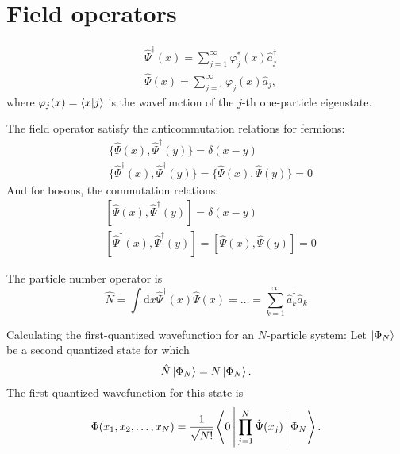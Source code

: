 \documentclass[11pt, a4paper]{article}
\newcommand{\dd}{\mathrm{d}}
\begin{document}
\section{Field operators}
\begin{align*}
    &\hat\Psi^{\dagger}(x) = \sum\limits_{j=1}^{\infty}\varphi^*_j(x)\hat a_j^{\dagger}\\
    &\hat\Psi(x) = \sum\limits_{j=1}^{\infty}\varphi_j(x)\hat a_j,
\end{align*}
where $\varphi_j(x) = \braket{x|j}$ is the wavefunction of the $j$-th one-particle eigenstate.

The field operator satisfy the anticommutation relations for fermions:
\begin{align*}
    &\{\hat\Psi(x),\hat\Psi^{\dagger}(y)\} = \delta(x-y)\\
    &\{\hat\Psi^{\dagger}(x),\hat\Psi^{\dagger}(y)\} = \{\hat\Psi(x),\hat\Psi(y)\} = 0
\end{align*}
And for bosons, the commutation relations:
\begin{align*}
    &[\hat\Psi(x),\hat\Psi^{\dagger}(y)] = \delta(x-y)\\
    &[\hat\Psi^{\dagger}(x),\hat\Psi^{\dagger}(y)] = [\hat\Psi(x),\hat\Psi(y)] = 0
\end{align*}

The particle number operator is 
\begin{equation*}
    \hat N = \int\dd x \hat\Psi^{\dagger}(x)\hat\Psi(x) = \dots = \sum\limits_{k=1}^{\infty}\hat a_k^{\dagger}\hat a_k
\end{equation*}

Calculating the first-quantized wavefunction for an $N$-particle system:
Let $\ket{\Phi_N}$ be a second quantized state for which
\begin{equation*}
    \hat N \ket{\Phi_N} = N \ket{\Phi_N}.
\end{equation*}
The first-quantized wavefunction for this state is 
\begin{equation*}
    \Phi(x_1, x_2, \dots, x_N) = \frac{1}{\sqrt{N!}}\Braket{0| \prod\limits_{j=1}^{N} \hat\Psi(x_j) | \Phi_N }.
\end{equation*}
\end{document}
